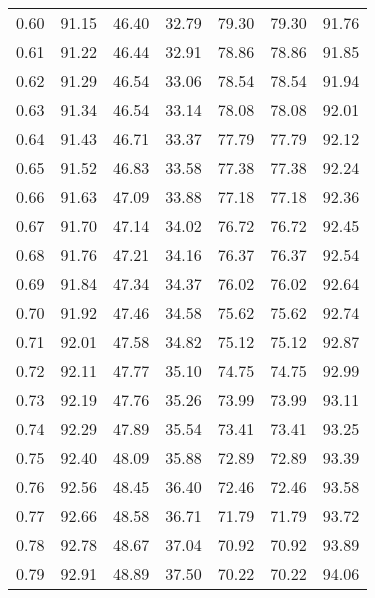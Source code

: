 \begin{tabular}{|c|c|c|c|c|c|c|}
      0.60 &     91.15 &     46.40 &      32.79 &   79.30 &      79.30 &         91.76 \\
      0.61 &     91.22 &     46.44 &      32.91 &   78.86 &      78.86 &         91.85 \\
      0.62 &     91.29 &     46.54 &      33.06 &   78.54 &      78.54 &         91.94 \\
      0.63 &     91.34 &     46.54 &      33.14 &   78.08 &      78.08 &         92.01 \\
      0.64 &     91.43 &     46.71 &      33.37 &   77.79 &      77.79 &         92.12 \\
      0.65 &     91.52 &     46.83 &      33.58 &   77.38 &      77.38 &         92.24 \\
      0.66 &     91.63 &     47.09 &      33.88 &   77.18 &      77.18 &         92.36 \\
      0.67 &     91.70 &     47.14 &      34.02 &   76.72 &      76.72 &         92.45 \\
      0.68 &     91.76 &     47.21 &      34.16 &   76.37 &      76.37 &         92.54 \\
      0.69 &     91.84 &     47.34 &      34.37 &   76.02 &      76.02 &         92.64 \\
      0.70 &     91.92 &     47.46 &      34.58 &   75.62 &      75.62 &         92.74 \\
      0.71 &     92.01 &     47.58 &      34.82 &   75.12 &      75.12 &         92.87 \\
      0.72 &     92.11 &     47.77 &      35.10 &   74.75 &      74.75 &         92.99 \\
      0.73 &     92.19 &     47.76 &      35.26 &   73.99 &      73.99 &         93.11 \\
      0.74 &     92.29 &     47.89 &      35.54 &   73.41 &      73.41 &         93.25 \\
      0.75 &     92.40 &     48.09 &      35.88 &   72.89 &      72.89 &         93.39 \\
      0.76 &     92.56 &     48.45 &      36.40 &   72.46 &      72.46 &         93.58 \\
      0.77 &     92.66 &     48.58 &      36.71 &   71.79 &      71.79 &         93.72 \\
      0.78 &     92.78 &     48.67 &      37.04 &   70.92 &      70.92 &         93.89 \\
      0.79 &     92.91 &     48.89 &      37.50 &   70.22 &      70.22 &         94.06 \\

\end{tabular}
